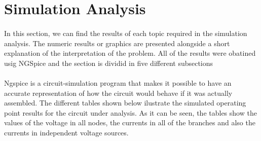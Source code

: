 \section{Simulation Analysis}
\label{sec:simulation}

\paragraph{}
In this section, we can find the results of each topic required in the simulation analysis. The numeric results or graphics are presented alongside a short explanation of the interpretation of the problem. All of the results were obatined usig NGSpice and the section is dividid in five different subsections 

\paragraph{}
Ngspice is a circuit-simulation program that makes it possible to have an accurate representation of how the circuit would behave if it was actually assembled. The different tables shown below ilustrate the simulated operating point results for the circuit under analysis. As it can be seen, the tables show the values of the voltage in all nodes, the currents in all of the branches and also the currents in independent voltage sources.
